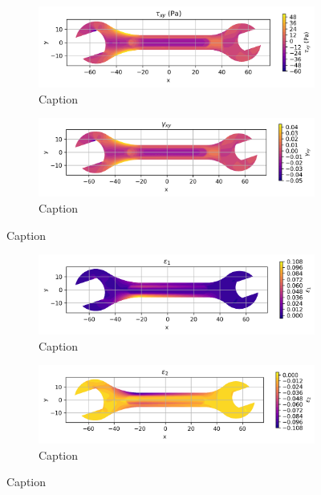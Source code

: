 \documentclass{article}  %
\begin{document}
\begin{figure}[H]
  \centering
  \begin{subfigure}[t]{0.49\textwidth}
    \centering
    \includegraphics[width=\textwidth]{GRAFICOS/Case b - tau_xy.png}
    \caption{Caption}
    \label{fig:deformada_reacciones}
  \end{subfigure}
  \hfill
  \begin{subfigure}[t]{0.49\textwidth}
    \centering
    \includegraphics[width=\textwidth]{GRAFICOS/Case b - gamma_xy.png}
    \caption{Caption}
    \label{fig:von_mises}
  \end{subfigure}
  \caption{Caption}
  \label{fig:analisis_estructural}
\end{figure}

\begin{figure}[H]
  \centering
  \begin{subfigure}[t]{0.49\textwidth}
    \centering
    \includegraphics[width=\textwidth]{GRAFICOS/Case b - epsilon_1.png}
    \caption{Caption}
    \label{fig:deformada_reacciones}
  \end{subfigure}
  \hfill
  \begin{subfigure}[t]{0.49\textwidth}
    \centering
    \includegraphics[width=\textwidth]{GRAFICOS/Case b - epsilon_2.png}
    \caption{Caption}
    \label{fig:von_mises}
  \end{subfigure}
  \caption{Caption}
  \label{fig:analisis_estructural}
\end{figure}
\end{document}
